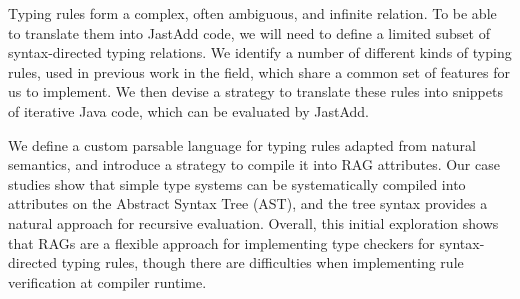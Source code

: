 \documentclass[nofilelist]{cslthse-msc}
\newcommand{\CR}[1]{\textcolor{green!60!black}{[\textbf{CR}:#1]}}
\begin{document}
Typing rules form a complex, often ambiguous, and infinite relation.
To be able to translate them into JastAdd code, we will need to define a limited subset of syntax-directed typing relations.
We identify a number of different kinds of typing rules, used in previous work in the field\cite{Pierce}, which share a common set of features for us to implement.
We then devise a strategy to translate these rules into snippets of iterative Java code, which can be evaluated by JastAdd.


We define a custom parsable language for typing rules adapted from natural semantics, and introduce a strategy to compile it into RAG attributes.
Our case studies show that simple type systems can be systematically compiled into attributes on the Abstract Syntax Tree (AST), and the tree syntax provides a natural approach for recursive evaluation.
Overall, this initial exploration shows that RAGs are a flexible approach for implementing type checkers for syntax-directed typing rules, though there are difficulties when implementing rule verification at compiler runtime.


\end{document}
